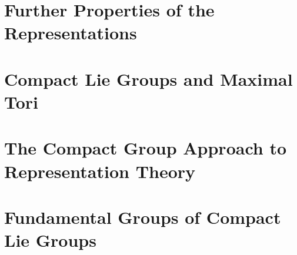 \documentclass[oneside]{amsbook}
\begin{document}
\chapter{Further Properties of the Representations}


\chapter{Compact Lie Groups and Maximal Tori}


\chapter{The Compact Group Approach to Representation Theory}


\chapter{Fundamental Groups of Compact Lie Groups}

\end{document}
